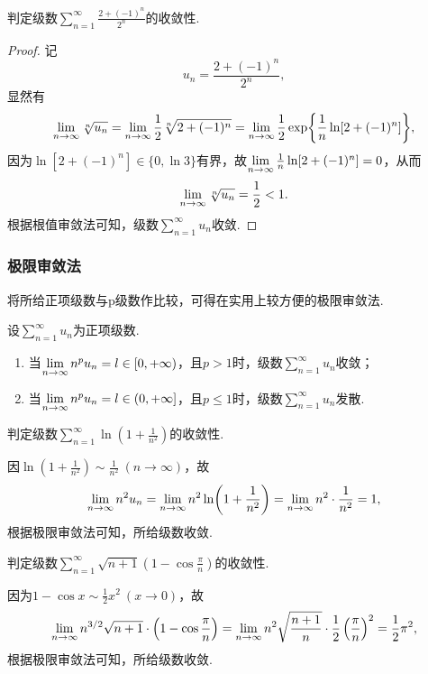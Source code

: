 \begin{example}
\def\s{\sum\limits_{n=1}^\infty }
判定级数\(\s \frac{2+(-1)^n}{2^n}\)的收敛性.
\begin{proof}
记\[
u_n = \frac{2+(-1)^n}{2^n},
\]显然有\[
\lim\limits_{n\to\infty} \sqrt[n]{u_n}
= \lim\limits_{n\to\infty} \frac{1}{2} \sqrt[n]{2+(-1)^n}
= \lim\limits_{n\to\infty} \frac{1}{2} \exp{\frac{1}{n} \ln[2+(-1)^n]},
\]因为\(\ln[2+(-1)^n] \in \{ 0, \ln3 \}\)有界，故\(\lim\limits_{n\to\infty} \frac{1}{n} \ln[2+(-1)^n] = 0\)，从而\[
\lim\limits_{n\to\infty} \sqrt[n]{u_n} = \frac{1}{2} < 1.
\]根据根值审敛法可知，级数\(\s u_n\)收敛.
\end{proof}
\end{example}

\subsubsection{极限审敛法}
将所给正项级数与p级数作比较，可得在实用上较方便的极限审敛法.
\begin{theorem}[极限审敛法]\label{theorem:无穷级数.正项级数的极限审敛法}
设\(\sum\limits_{n=1}^\infty u_n\)为正项级数.
\begin{enumerate}
\item 当\(\lim\limits_{n\to\infty} n^p u_n = l\in[0,+\infty)\)，且\(p>1\)时，级数\(\sum\limits_{n=1}^\infty u_n\)收敛；
\item 当\(\lim\limits_{n\to\infty} n^p u_n = l\in(0,+\infty]\)，且\(p\leq1\)时，级数\(\sum\limits_{n=1}^\infty u_n\)发散.
\end{enumerate}
\end{theorem}

\begin{example}
\def\s{\sum\limits_{n=1}^\infty }
判定级数\(\s \ln(1+\frac{1}{n^2})\)的收敛性.
\begin{solution}
因\(\ln(1+\frac{1}{n^2}) \sim \frac{1}{n^2}\ (n\to\infty)\)，故\[
\lim\limits_{n\to\infty} n^2 u_n = \lim\limits_{n\to\infty} n^2 \ln(1+\frac{1}{n^2})
= \lim\limits_{n\to\infty} n^2 \cdot \frac{1}{n^2} = 1,
\]根据极限审敛法可知，所给级数收敛.
\end{solution}
\end{example}

\begin{example}
\def\s{\sum\limits_{n=1}^\infty }
判定级数\(\s \sqrt{n+1} \left(1-\cos\frac{\pi}{n}\right)\)的收敛性.
\begin{solution}
因为\(1 - \cos x \sim \frac{1}{2} x^2\ (x\to0)\)，故\[
\lim\limits_{n\to\infty} n^{3/2} \sqrt{n+1} \cdot \left(1-\cos\frac{\pi}{n}\right)
= \lim\limits_{n\to\infty} n^2 \sqrt{\frac{n+1}{n}} \cdot \frac{1}{2} \left(\frac{\pi}{n}\right)^2
= \frac{1}{2} \pi^2,
\]根据极限审敛法可知，所给级数收敛.
\end{solution}
\end{example}

